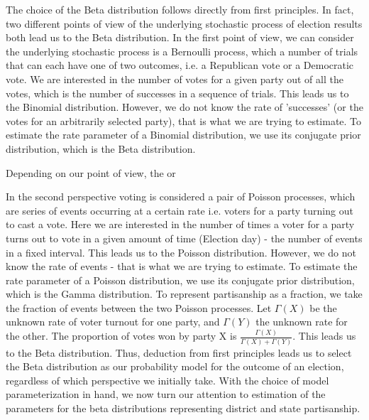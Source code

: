 \documentclass[preprint,12pt]{article}
\begin{document}
The choice of the Beta distribution follows directly from first principles. 
In fact, two different points of view of the underlying stochastic process of election results both lead us to the Beta distribution. 
In the first point of view, we can consider the underlying stochastic process is a Bernoulli process, which a number of trials that can each have one of two outcomes, i.e. a Republican vote or a Democratic vote.
We are interested in the number of votes for a given party out of all the votes, which is the number of successes in a sequence of trials.  
This leads us to the Binomial distribution. 
However, we do not know the rate of 'successes' (or the votes for an arbitrarily selected party), that is what we are trying to estimate.  
To estimate the rate parameter of a Binomial distribution, we use its conjugate prior distribution, which is the Beta distribution.

Depending on our point of view, the or   

In the second perspective voting is considered a pair of Poisson processes, which are series of events occurring at a certain rate i.e. voters for a party turning out to cast a vote. 
Here we are interested in the number of times a voter for a party turns out to vote in a given amount of time (Election day) - the number of events in a fixed interval. 
This leads us to the Poisson distribution.  
However, we do not know the rate of events - that is what we are trying to estimate.  
To estimate the rate parameter of a Poisson distribution, we use its conjugate prior distribution, which is the Gamma distribution. 
To represent partisanship as a fraction, we take the fraction of events between the two Poisson processes.  
Let $\Gamma\left(X\right)$ be the unknown rate of voter turnout for one party, and $\Gamma\left(Y\right)$ the unknown rate for the other.
The proportion of votes won by party X is $\frac{\Gamma\left(X\right)}{\Gamma\left(X\right)+\Gamma\left(Y\right)} $. 
This leads us to the Beta distribution.
Thus, deduction from first principles leads us to select the Beta distribution as our probability model for the outcome of an election, regardless of which perspective we initially take.
With the choice of model parameterization in hand, we now turn our attention to estimation of the parameters for the beta distributions representing district and state partisanship.
\end{document}
